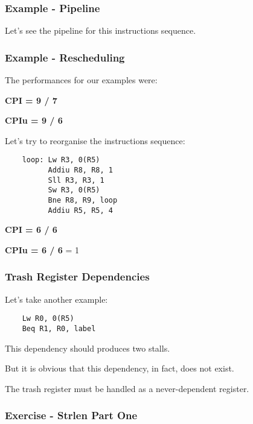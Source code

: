 
\begin{frame}
  \frametitle{Example - Pipeline}

  Let's see the pipeline for this instructions sequence.

  \begin{center}
  \end{center}
\end{frame}


\begin{frame}[containsverbatim]
  \frametitle{Example - Rescheduling}

  The performances for our examples were:

  \nl

  \textbf{CPI = 9 / 7}

  \textbf{CPIu = 9 / 6}

  \nl

  Let's try to reorganise the instructions sequence:

  \begin{verbatim}
    loop: Lw R3, 0(R5)
          Addiu R8, R8, 1
          Sll R3, R3, 1
          Sw R3, 0(R5)
          Bne R8, R9, loop
          Addiu R5, R5, 4
  \end{verbatim}

  \textbf{CPI = 6 / 6}

  \textbf{CPIu = 6 / 6} \alert{= 1}
\end{frame}


\begin{frame}[containsverbatim]
  \frametitle{Trash Register Dependencies}

  Let's take another example:

  \begin{verbatim}
    Lw R0, 0(R5)
    Beq R1, R0, label
  \end{verbatim}

  This dependency should produces two stalls.

  \nl

  But it is obvious that this dependency, in fact, does not exist.

  \nl

  The trash register must be handled as a never-dependent register.
\end{frame}


\begin{frame}
  \frametitle{Exercise - Strlen Part One}

  \begin{center}
  \end{center}
\end{frame}

